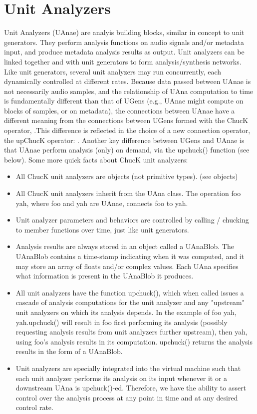 \chapter{Unit Analyzers} 
Unit Analyzers (UAnae) are analyis building blocks, similar in concept to unit
generators. They perform analysis functions on audio signals and/or metadata
input, and produce metadata analysis results as output. Unit analyzers can be
linked together and with unit generators to form analysis/synthesis networks.
Like unit generators, several unit analyzers may run concurrently, each
dynamically controlled at different rates. Because data passed between UAnae is
not necessarily audio samples, and the relationship of UAna computation to time
is fundamentally different than that of UGens (e.g., UAnae might compute on
blocks of samples, or on metadata), the connections between UAnae have
a different meaning from the connections between UGens formed with the ChucK
operator, \chuckop.This difference is reflected in the choice of a new connection
operator, the upChucK operator: \upchuckop. Another key difference between UGens and
UAnae is that UAnae perform analysis (only) on demand, via the upchuck()
function (see below).
Some more quick facts about ChucK unit analyzers:
\begin{itemize}
    \item All ChucK unit analyzers are objects (not primitive types). (see objects)
    \item  All ChucK unit analyzers inherit from the UAna class.
     The operation foo \upchuckop yah, where foo and yah are UAnae, connects foo
      to yah.
    \item   Unit analyzer parameters and behaviors are controlled by calling /
      chucking to member functions over time, just like unit generators.
    \item   Analysis results are always stored in an object called a UAnaBlob. The
      UAnaBlob contains a time-stamp indicating when it was computed, and it
      may store an array of floats and/or complex values. Each UAna specifies
      what information is present in the UAnaBlob it produces.
    \item   All unit analyzers have the function upchuck(), which when called issues
      a cascade of analysis computations for the unit analyzer and any
      "upstream" unit analyzers on which its analysis depends.  In the example
      of foo \upchuckop yah,  yah.upchuck() will result in foo first performing its
      analysis (possibly requesting analysis results from unit analyzers
      further upstream), then yah, using foo's analysis results in its
      computation. upchuck() returns the analysis results in the form of
      a UAnaBlob.
    \item   Unit analyzers are specially integrated into the virtual machine such
      that each unit analyzer performs its analysis on its input whenever it or
      a downstream UAna is upchuck()-ed. Therefore, we have the ability to
      assert control over the analysis process at any point in time and at any
      desired control rate.
\end{itemize}
